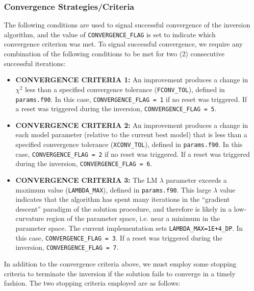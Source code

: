 \documentclass[11pt]{article}
\begin{document}
\subsubsection{Convergence Strategies/Criteria}\label{ss:conv}
The following conditions are used to signal successful convergence of the inversion algorithm, and 
the value of \texttt{CONVERGENCE\_FLAG} is set to indicate which convergence criterion was met.  To signal
successful convergence, we require any combination of the following conditions to be met for two (2) consecutive
successful iterations:

\begin{itemize}
  \renewcommand\labelitemi{\scriptsize$\blacksquare$}
  \item \textbf{CONVERGENCE CRITERIA 1:} An improvement produces a change in
        $\chi^{2}$ less than a specified convergence tolerance (\texttt{FCONV\_TOL}), defined in \texttt{params.f90}.
        In this case, \texttt{CONVERGENCE\_FLAG = 1} if no reset was triggered.  If a reset was triggered during
        the inversion, \texttt{CONVERGENCE\_FLAG = 5}.
  \item \textbf{CONVERGENCE CRITERIA 2:} An improvement produces a change in each model
        parameter (relative to the current best model) that is less than a specified convergence tolerance
        (\texttt{XCONV\_TOL}), defined in \texttt{params.f90}.  In this case, \texttt{CONVERGENCE\_FLAG = 2} if 
        no reset was triggered.  If a reset was triggered during the inversion, \texttt{CONVERGENCE\_FLAG = 6}.
  \item \textbf{CONVERGENCE CRITERIA 3:} The LM $\lambda$ parameter exceeds a maximum value (\texttt{LAMBDA\_MAX}), defined
        in \texttt{params.f90}.  This large $\lambda$ value indicates that the algorithm has
        spent many iterations in the ``gradient descent'' paradigm of the solution procedure,
        and therefore is likely in a low-curvature region of the parameter space, i.e. near a minimum in
        the parameter space.  The current implementation sets \texttt{LAMBDA\_MAX=1E+4\_DP}.  In this
        case, \texttt{CONVERGENCE\_FLAG = 3}. If a reset was triggered during the inversion,
        \texttt{CONVERGENCE\_FLAG = 7}.
\end{itemize}

In addition to the convergence criteria above, we must employ some stopping criteria to terminate the inversion
if the solution fails to converge in a timely fashion.  The two stopping criteria employed are as follows:
\end{document}
